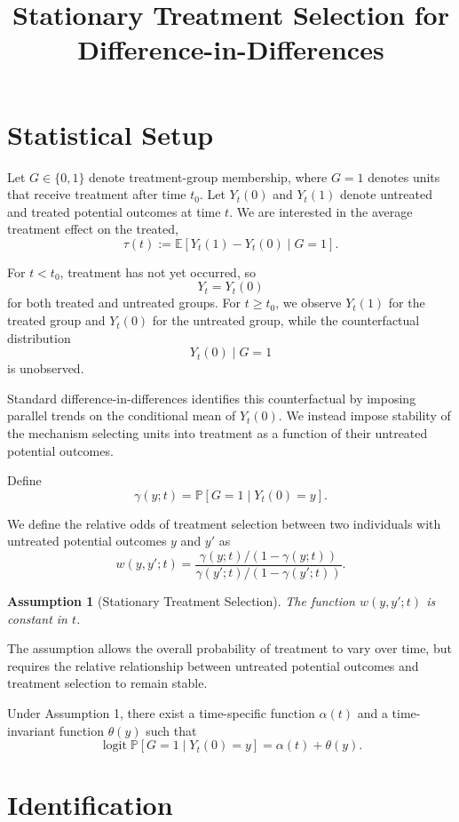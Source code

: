\documentclass[11pt]{article}
\title{Stationary Treatment Selection for Difference-in-Differences}
\author{}
\date{}
\newtheorem{assumption}{Assumption}
\begin{document}
\maketitle

\section{Statistical Setup}

Let $G\in\{0,1\}$ denote treatment-group membership, where $G=1$ denotes units that receive treatment after time $t_0$. Let $Y_t(0)$ and $Y_t(1)$ denote untreated and treated potential outcomes at time $t$. We are interested in the average treatment effect on the treated,
\[
\tau(t)
:=
\mathbb E[Y_t(1)-Y_t(0)\mid G=1].
\]

For $t<t_0$, treatment has not yet occurred, so
\[
Y_t=Y_t(0)
\]
for both treated and untreated groups. For $t\ge t_0$, we observe $Y_t(1)$ for the treated group and $Y_t(0)$ for the untreated group, while the counterfactual distribution
\[
Y_t(0)\mid G=1
\]
is unobserved.

Standard difference-in-differences identifies this counterfactual by imposing parallel trends on the conditional mean of $Y_t(0)$. We instead impose stability of the mechanism selecting units into treatment as a function of their untreated potential outcomes.

Define
\[
\gamma(y;t)
=
\mathbb P[G=1\mid Y_t(0)=y].
\]

We define the relative odds of treatment selection between two individuals with untreated potential outcomes $y$ and $y'$ as
\[
w(y,y';t)
=
\frac{
\gamma(y;t)/(1-\gamma(y;t))
}{
\gamma(y';t)/(1-\gamma(y';t))
}.
\]

\begin{assumption}[Stationary Treatment Selection]
The function $w(y,y';t)$ is constant in $t$.
\end{assumption}

The assumption allows the overall probability of treatment to vary over time, but requires the relative relationship between untreated potential outcomes and treatment selection to remain stable.

Under Assumption 1, there exist a time-specific function $\alpha(t)$ and a time-invariant function $\theta(y)$ such that
\[
\operatorname{logit}\mathbb P[G=1\mid Y_t(0)=y]
=
\alpha(t)+\theta(y).
\]

\section{Identification}
\end{document}
